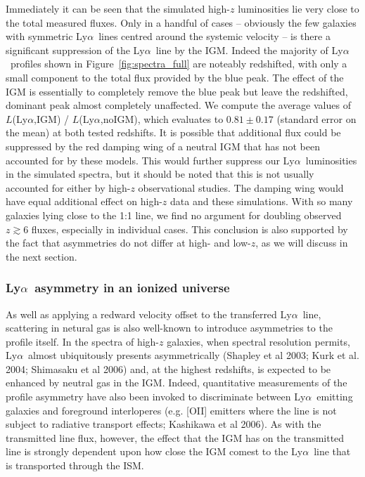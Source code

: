 \documentclass[manuscript]{emulateapj}
\newcommand{\lya}{Ly$\alpha$}
\begin{document}
Immediately it can be seen that the simulated high-$z$ luminosities lie very close 
to the total measured fluxes. Only in a handful of cases -- obviously the few 
galaxies with symmetric \lya\ lines centred around the systemic velocity -- is there
a significant suppression of the \lya\ line by the IGM. Indeed the majority of \lya\
profiles shown in Figure~\ref{fig:spectra_full} are noteably redshifted, with only 
a small component to the total flux provided by the blue peak. The effect of the IGM 
is essentially to completely remove the blue peak but leave the redshifted, dominant 
peak almost completely unaffected. We compute the average values of 
$L$(\lya,IGM) / $L$(\lya,noIGM), which evaluates to $0.81 \pm 0.17$ (standard error 
on the mean) at both tested redshifts. It is possible that additional flux could be 
suppressed by the red damping wing of a neutral IGM that has not been accounted for 
by these models. This would further suppress our \lya\ luminosities in the simulated 
spectra, but it should be noted that this is not usually accounted for either by 
high-$z$ observational studies. The damping wing would have equal additional effect 
on high-$z$ data and these simulations. With so many galaxies lying close to the 
1:1 line, we find no argument for doubling observed $z\gtrsim 6$ fluxes, especially
in individual cases. This conclusion is also supported by the fact that asymmetries
do not differ at high- and low-$z$, as we will discuss in the next section.



\subsubsection{\lya\ asymmetry in an ionized universe}

As well as applying a redward velocity offset to the transferred \lya\ line, 
scattering in netural gas is also well-known to introduce asymmetries to the 
profile itself.  In the spectra of high-$z$ 
galaxies, when spectral resolution permits, \lya\ almost ubiquitously 
presents asymmetrically (Shapley et al 2003; Kurk et al. 2004; 
Shimasaku et al 2006) and, at the highest redshifts, is expected to be
enhanced by neutral gas in the IGM. Indeed, quantitative measurements of
the profile asymmetry have also been invoked to discriminate between 
\lya\ emitting galaxies and foreground interloperes (e.g. [OII] emitters
where the line is not subject to radiative transport effects; Kashikawa 
et al 2006). As with the transmitted line flux, however, the effect that
the IGM has on the transmitted line is strongly dependent upon how close
the IGM comest to the \lya\ line that is transported through the ISM. 
\end{document}
